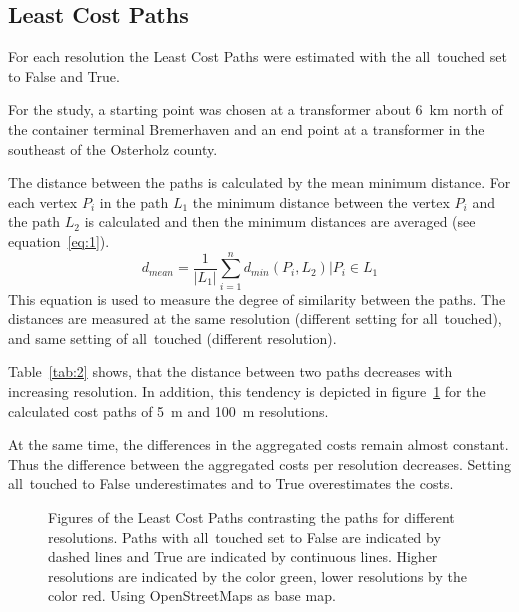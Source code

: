 \subsection{Least Cost Paths}\label{subsec:least-cost-paths}
For each resolution the Least Cost Paths were estimated with the all~touched set to False and True.

For the study, a starting point was chosen at a transformer about 6~km north of the container terminal Bremerhaven and an end point at a transformer in the southeast of the Osterholz county. 

The distance between the paths is calculated by the mean minimum distance.
For each vertex $P_i$ in the path $L_1$ the minimum distance between the vertex $P_i$ and the path $L_2$
is calculated and then the minimum distances are averaged (see equation~\ref{eq:1}).
\begin{equation}
	\label{eq:1}
	d_{mean} = \frac{1}{|L_1|} \sum_{i=1}^{n} d_{min}(P_i, L_2) \Bigr\vert P_i \in L_1
\end{equation}
This equation is used to measure the degree of similarity between the paths.
The distances are measured at the same resolution (different setting for all~touched), and same setting of all~touched (different resolution).

Table~\ref{tab:2} shows, that the distance between two paths decreases
with increasing resolution.
In addition, this tendency is depicted in figure~\ref{fig:paths_resolution} for the calculated cost paths of 5~m and 100~m resolutions.


At the same time, the differences in the aggregated costs remain almost constant.
Thus the difference between the aggregated costs per resolution decreases.
Setting all~touched to False underestimates and to True overestimates the costs.

\begin{figure}
	\centering

	\qquad
	\caption{Figures of the Least Cost Paths contrasting the paths for different resolutions. Paths with all~touched set to False are indicated by dashed lines and True are indicated by continuous lines. Higher resolutions are indicated by the color green, lower resolutions by the color red. Using OpenStreetMaps as base map.}
	\label{fig:paths_resolution}
\end{figure}

